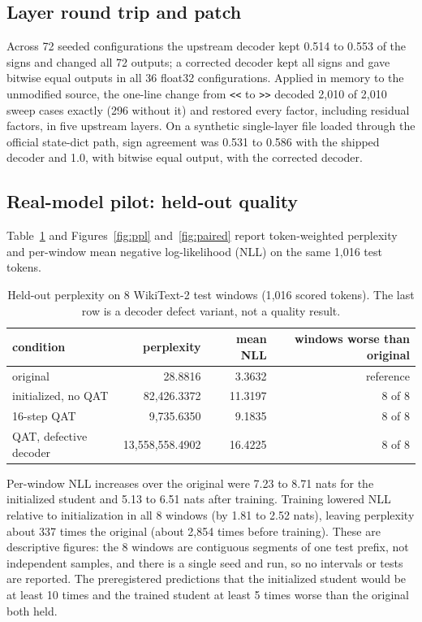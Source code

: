 \documentclass[11pt]{article}
\begin{document}
\subsection{Layer round trip and patch}
Across 72 seeded configurations the upstream decoder kept 0.514 to 0.553 of the signs and changed
all 72 outputs; a corrected decoder kept all signs and gave bitwise equal outputs in all 36
float32 configurations. Applied in memory to the unmodified source, the one-line change from
\texttt{<<} to \texttt{>>} decoded 2{,}010 of 2{,}010 sweep cases exactly (296 without it) and
restored every factor, including residual factors, in five upstream layers. On a synthetic
single-layer file loaded through the official state-dict path, sign agreement was 0.531 to 0.586
with the shipped decoder and 1.0, with bitwise equal output, with the corrected decoder.

\subsection{Real-model pilot: held-out quality}
Table~\ref{tab:ppl} and Figures~\ref{fig:ppl} and~\ref{fig:paired} report token-weighted
perplexity and per-window mean negative log-likelihood (NLL) on the same 1{,}016 test tokens.

\begin{table}[h]
\centering
\small
\begin{tabular}{lrrr}
\hline
condition & perplexity & mean NLL & windows worse than original \\
\hline
original & 28.8816 & 3.3632 & reference \\
initialized, no QAT & 82{,}426.3372 & 11.3197 & 8 of 8 \\
16-step QAT & 9{,}735.6350 & 9.1835 & 8 of 8 \\
QAT, defective decoder & 13{,}558{,}558.4902 & 16.4225 & 8 of 8 \\
\hline
\end{tabular}
\caption{Held-out perplexity on 8 WikiText-2 test windows (1{,}016 scored tokens). The last row is
a decoder defect variant, not a quality result.}
\label{tab:ppl}
\end{table}

Per-window NLL increases over the original were 7.23 to 8.71 nats for the initialized student and
5.13 to 6.51 nats after training. Training lowered NLL relative to initialization in all 8 windows
(by 1.81 to 2.52 nats), leaving perplexity about 337 times the original (about 2{,}854 times
before training). These are descriptive figures: the 8 windows are contiguous segments of one
test prefix, not independent samples, and there is a single seed and run, so no intervals or
tests are reported. The preregistered predictions that the initialized student would be at least
10 times and the trained student at least 5 times worse than the original both held.
\end{document}
